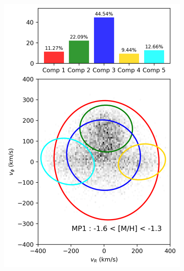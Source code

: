 \documentclass[a4paper,10pt]{article}
\begin{document}
\begin{multicols}{2}
\begin{figure}[t]
\begin{subfigure}[t]{0.245\textwidth}
    \centering\includegraphics[width=\linewidth]{../figures/gmm_MP1.png}
  \end{subfigure}\hfill
  \begin{subfigure}[t]{0.245\textwidth}

\end{subfigure}
\end{figure}
\end{multicols}
\end{document}
